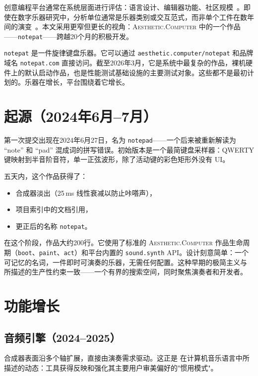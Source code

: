 \documentclass[10pt,letterpaper,twocolumn]{article}
\newcommand{\ac}{\textsc{Aesthetic.Computer}}
\begin{document}
创意编程平台通常在系统层面进行评估：语言设计、编辑器功能、社区规模~\citep{reas2007processing,mccarthy2015p5js,resnick2009scratch}。即使在数字乐器研究中，分析单位通常是乐器类别或交互范式，而非单个工件在数年间的演变~\citep{magnusson2010designing,marquez2018dmi}。本文采用更窄但更长的视角：\ac{} 中的一个作品——\texttt{notepat}——跨越20个月的积极开发。

\texttt{notepat} 是一件旋律键盘乐器。它可以通过 \texttt{aesthetic.computer/notepat} 和品牌域名 \texttt{notepat.com} 直接访问。截至2026年3月，它是系统中最复杂的作品，裸机硬件上的默认启动作品，也是性能测试基础设施的主要测试对象。这些都不是最初计划的。乐器在增长，平台围绕着它增长。

\section{起源（2024年6月--7月）}

第一次提交出现在2024年6月27日，名为 \texttt{notepad}——一个后来被重新解读为 ``note'' 和 ``pad'' 混成词的拼写错误。初始版本是一个最简键盘采样器：QWERTY 键映射到半音阶音符，单一正弦波形，除了活动键的彩色矩形外没有 UI。

五天内，这个作品获得了：
\begin{itemize}
  \item 合成器淡出（25\,ms 线性衰减以防止咔嗒声），
  \item 项目索引中的文档引用，
  \item 更正后的名称 \texttt{notepat}。
\end{itemize}

在这个阶段，作品大约200行。它使用了标准的 \ac{} 作品生命周期（\texttt{boot}、\texttt{paint}、\texttt{act}）和平台内置的 \texttt{sound.synth} API。设计刻意简单：一个可记忆的名词，一件即时可演奏的乐器，无需任何配置。这种早期的极简主义与 \citet{magnusson2010designing} 所描述的生产性约束一致——一个有界的搜索空间，同时聚焦演奏者和开发者。

\section{功能增长}

\subsection{音频引擎（2024--2025）}

合成器表面沿多个轴扩展，直接由演奏需求驱动。这正是 \citet{mcpherson2020idiomatic} 在计算机音乐语言中所描述的动态：工具获得反映和强化其主要用户审美偏好的"惯用模式"。
\end{document}
